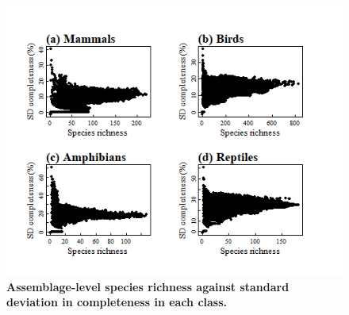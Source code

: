 \begin{figure}[h!]
\centering
\includegraphics[scale=0.8]{Supporting/Chapter2/Figures/Maps/sd_SR.png}
\caption[Assemblage-level species richness against standard deviation in completeness in each class]{\textbf{Assemblage-level species richness against standard deviation in completeness in each class.}}
\label{SI2_sdcomp_sr}
\end{figure}

\clearpage
\newpage
\pagebreak

\clearpage
\newpage
\pagebreak

